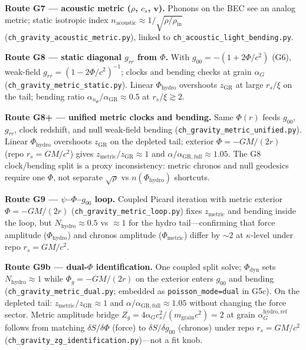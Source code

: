 \documentclass[11pt,a4paper]{article}
\begin{document}
\textbf{Route G7 --- acoustic metric ($\rho$, $c_s$, $\mathbf{v}$).}
Phonons on the BEC see an analog metric; static isotropic index $n_{\mathrm{acoustic}} \approx 1/\sqrt{\rho/\rho_{\mathrm{in}}}$ (\texttt{ch\_gravity\_acoustic\_metric.py}), linked to \texttt{ch\_acoustic\_light\_bending.py}.

\textbf{Route G8 --- static diagonal $g_{rr}$ from $\Phi$.}
With $g_{00}=-(1+2\Phi/c^2)$ (G6), weak-field $g_{rr}=(1-2\Phi/c^2)^{-1}$; clocks and bending checks at grain $\alpha_G$ (\texttt{ch\_gravity\_metric\_static.py}). Linear $\Phi_{\mathrm{hydro}}$ overshoots $z_{\mathrm{GR}}$ at large $r_s/\xi$ on the tail; bending ratio $\alpha_{n_\Phi}/\alpha_{\mathrm{GR}}\approx 0.5$ at $r_s/\xi\gtrsim 2$.

\textbf{Route G8+ --- unified metric clocks and bending.}
Same $\Phi(r)$ feeds $g_{00}$, $g_{rr}$, clock redshift, and null weak-field bending (\texttt{ch\_gravity\_metric\_unified.py}). Linear $\Phi_{\mathrm{hydro}}$ overshoots $z_{\mathrm{GR}}$ on the depleted tail; exterior $\Phi=-GM/(2r)$ (repo $r_s=GM/c^2$) gives $z_{\mathrm{metric}}/z_{\mathrm{GR}}\approx 1$ and $\alpha/\alpha_{\mathrm{GR,full}}\approx 1.05$. The G8 clock/bending split is a proxy inconsistency: metric chronos and null geodesics require one $\Phi$, not separate $\sqrt{\rho}$ vs $n(\Phi_{\mathrm{hydro}})$ shortcuts.

\textbf{Route G9 --- $\psi$--$\Phi$--$g_{00}$ loop.}
Coupled Picard iteration with metric exterior $\Phi=-GM/(2r)$ (\texttt{ch\_gravity\_metric\_loop.py}) fixes $z_{\mathrm{metric}}$ and bending inside the loop, but $N_{\mathrm{hydro}}\approx 0.5$ vs $\approx 1$ for the hydro tail---confirming that force amplitude ($\Phi_{\mathrm{hydro}}$) and chronos amplitude ($\Phi_{\mathrm{metric}}$) differ by $\sim 2$ at $\kappa$-level under repo $r_s=GM/c^2$.

\textbf{Route G9b --- dual-$\Phi$ identification.}
One coupled split solve; $\Phi_{\mathrm{dyn}}$ sets $N_{\mathrm{hydro}}\approx 1$ while $\Phi_g=-GM/(2r)$ on the exterior enters $g_{00}$ and bending (\texttt{ch\_gravity\_metric\_dual.py}; embedded as \texttt{poisson\_mode=dual} in G5c). On the depleted tail: $z_{\mathrm{metric}}/z_{\mathrm{GR}}\approx 1$ and $\alpha/\alpha_{\mathrm{GR,full}}\approx 1.05$ without changing the force sector. Metric amplitude bridge $Z_g=4\alpha_G c_s^2/(m_{\mathrm{grain}} c^2)=2$ at grain $\alpha_G^{\mathrm{hydro,ref}}$ follows from matching $\delta S/\delta\Phi$ (force) to $\delta S/\delta g_{00}$ (chronos) under repo $r_s=GM/c^2$ (\texttt{ch\_gravity\_zg\_identification.py})---not a fit knob.
\end{document}
